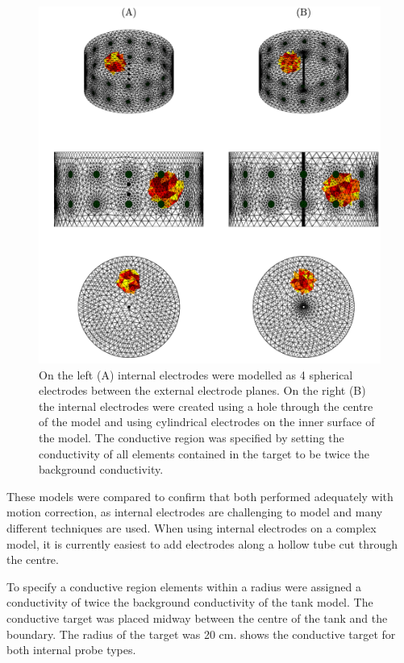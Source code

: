 \begin{figure}
    \centering
   \includegraphics[width=\textwidth]{chapter7-internal_elec_motion/imgs/probe_types.pdf} 
   \caption[Spherical and cylindrical internal electrodes]{\label{fig:probe_types} 
   On the left (A) internal electrodes were modelled as 4 spherical electrodes between the 
   external electrode planes. On the right (B) the internal electrodes were created using 
   a hole through the centre of the model and using cylindrical electrodes on the inner 
   surface of the model.
	The conductive region was specified by setting the conductivity of all elements 
	contained in the target to be twice the background conductivity.}
\end{figure}

These models were compared to confirm that both 
performed adequately with motion correction, as internal electrodes 
are challenging to model and many different techniques are used. 
When using internal electrodes on a complex model, it is currently easiest 
to add electrodes along a hollow tube cut through the centre. 

To specify a conductive region elements within a radius were assigned a conductivity 
of twice the background conductivity of the tank model.
The conductive target was placed midway between the centre of the tank and the boundary. The radius of the target was 20 cm. 
 shows the conductive target for both internal probe types.

